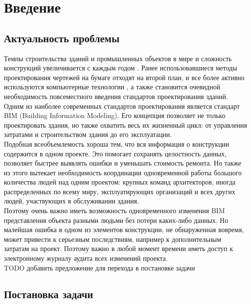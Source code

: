 \documentclass[a4paper,14pt]{extreport} %
\begin{document}
\tableofcontents %

\newpage
\chapter{Введение}
\section{Актуальность проблемы}

Темпы строительства зданий и промышленных объектов в мире и сложность конструкций увеличивается с каждым годом \cite{BUILDING_GROWTH_RATE}. Ранее использовавшиеся методы проектирования чертежей на бумаге отходят на второй план, и все более активно используются компьютерные технологии \cite{BUILDING_SOFTWARE}, а также становится очевидной необходимость повсеместного введения стандартов проектирования зданий. \\
Одним из наиболее современных стандартов проектирования является стандарт BIM (Building Information Modeling)\cite{BIM_FUTURE}. Его концепция позволяет не только проектировать здания, но также охватить весь их жизненный цикл: от управления затратами и строительством здания до его эксплуатации. \\
Подобная всеобъемлемость хороша тем, что вся информация о конструкции содержится в одном проекте. Это помогает сохранять целостность данных, позволяет быстрее выявлять ошибки и уменьшать стоимость ремонта. Но также из этого вытекает необходимость координации одновременной работы большого количества людей над одним проектом: крупных команд архитекторов, иногда распределенных по всему миру, эксплуатирующих организаций и всех других людей, участвующих в обслуживании здания. \\
Поэтому очень важно иметь возможность одновременного изменения BIM представления объекта разными людьми без потери каких-либо данных. Но малейшая ошибка в одном из элементов конструкции, не обнаруженная вовремя, может привести к серьезным последствиям, например к дополнительным затратам на проект. Поэтому важно в любой момент времени иметь доступ к электронному журналу аудита всех изменений проекта. \\

TODO добавить предложение для перехода в постановке задачи


\newpage 
\section{Постановка задачи}
\end{document}
